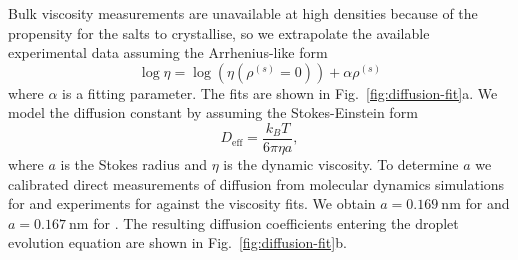 \documentclass[11pt,twoside]{report}
\begin{document}
Bulk viscosity measurements are unavailable at high densities because of the propensity for the salts to crystallise, so we extrapolate the available experimental data \cite{PowerCS2013}  assuming the Arrhenius-like form
\begin{equation}\label{eq:vft-fit}
  \log{\eta}
  =
  \log{\left(\eta(\rho^{(s)} = 0)\right)}
  + \alpha \rho^{(s)}
\end{equation}
where $\alpha$ is a fitting parameter.
The fits are shown in Fig.\ \ref{fig:diffusion-fit}a.
We model the diffusion constant by assuming the Stokes-Einstein form
\begin{equation}\label{eq:stokes-einstein}
  D_\mathrm{eff} = \frac{k_B T}{6 \pi \eta a},
\end{equation}
where $a$ is the Stokes radius and $\eta$ is the dynamic viscosity.
To determine $a$ we calibrated direct measurements of diffusion from molecular dynamics simulations for \cite{LyubartsevJPC1996} and experiments for \cite{YehJCED1970} against the viscosity fits.
We obtain $a=\SI{0.169}{\nano\metre}$ for  and $a=\SI{0.167}{\nano\metre}$ for .
The resulting diffusion coefficients entering the droplet evolution equation are shown in Fig.\ \ref{fig:diffusion-fit}b.
\end{document}
